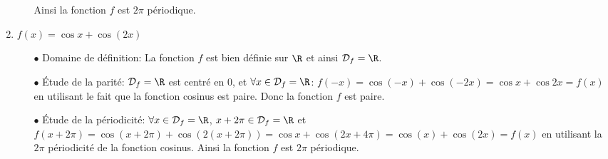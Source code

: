 \begin{correction}
\begin{enumerate}
\begin{itemize}
Ainsi la fonction $f$ est $2\pi$ p\'eriodique.
\end{itemize}
\item $f(x)=\cos{x}+\cos{(2x)}$ 
\begin{itemize}
\item[$\bullet$] Domaine de d\'efinition: La fonction $f$ est bien d\'efinie sur $\R$ et ainsi $\mathcal{D}_f=\R$.
\item[$\bullet$] \'Etude de la parit\'e: $\mathcal{D}_f=\R$ est centr\'e en 0, et $\forall x\in\mathcal{D}_f=\R$: $f(-x)=\cos{(-x)}+\cos{(-2x)}=\cos{x}+\cos{2x}=f(x)$ en utilisant le fait que la fonction cosinus est paire.
Donc la fonction $f$ est paire.
\item[$\bullet$] \'Etude de la p\'eriodicit\'e: $\forall x\in\mathcal{D}_f=\R$, $x+2\pi\in\mathcal{D}_f=\R$ et $f(x+2\pi)=\cos{(x+2\pi)}+\cos{(2(x+2\pi))}=\cos{x}+\cos{(2x+4\pi)}=\cos{(x)}+\cos{(2x)}=f(x)$ en utilisant la $2\pi$ p\'eriodicit\'e de la fonction cosinus.
Ainsi la fonction $f$ est $2\pi$ p\'eriodique.
\end{itemize}
\end{enumerate}
\end{correction}
